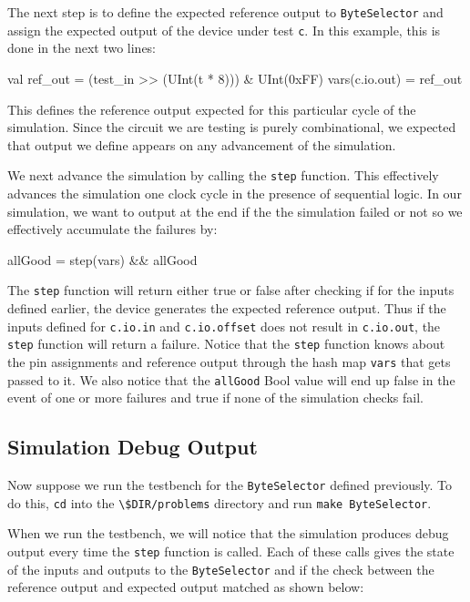 \documentclass[twocolumn, 10pt]{article}
\begin{document}
The next step is to define the expected reference output to \verb+ByteSelector+ and assign the expected output of the device under test \verb+c+. In this example, this is done in the next two lines:

\begin{scala}
val ref_out = (test_in >> (UInt(t * 8))) & UInt(0xFF)
vars(c.io.out) = ref_out
\end{scala}

This defines the reference output expected for this particular cycle of the simulation. Since the circuit we are testing is purely combinational, we expected that output we define appears on any advancement of the simulation.

We next advance the simulation by calling the \verb+step+ function. This effectively advances the simulation one clock cycle in the presence of sequential logic. In our simulation, we want to output at the end if the the simulation failed or not so we effectively accumulate the failures by:

\begin{scala}
allGood = step(vars) && allGood
\end{scala}

The \verb+step+ function will return either true or false after checking if for the inputs defined earlier, the device generates the expected reference output. Thus if the inputs defined for \verb+c.io.in+ and \verb+c.io.offset+ does not result in \verb+c.io.out+, the \verb+step+ function will return a failure. Notice that the \verb+step+ function knows about the pin assignments and reference output through the hash map \verb+vars+ that gets passed to it. We also notice that the \verb+allGood+ Bool value will end up false in the event of one or more failures and true if none of the simulation checks fail.

\subsection{Simulation Debug Output}

Now suppose we run the testbench for the \verb+ByteSelector+ defined previously. To do this, \verb+cd+ into the \verb+\$DIR/problems+ directory and run \verb+make ByteSelector+.

When we run the testbench, we will notice that the simulation produces debug output every time the \verb+step+ function is called. Each of these calls gives the state of the inputs and outputs to the \verb+ByteSelector+ and if the check between the reference output and expected output matched as shown below:
\end{document}
